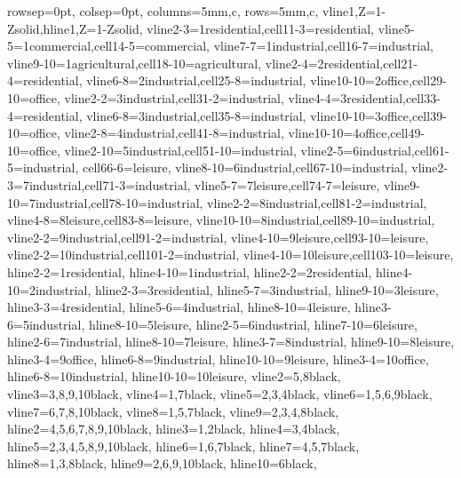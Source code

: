 \documentclass[margin=3mm]{standalone}
\begin{document}
\begin{tblr}{
rowsep=0pt, colsep=0pt, columns={5mm,c}, rows={5mm,c},
vline{1,Z}={1-Z}{solid},hline{1,Z}={1-Z}{solid},
vline{2-3}={1}{residential},cell{1}{1-3}={}{residential}, vline{5-5}={1}{commercial},cell{1}{4-5}={}{commercial}, vline{7-7}={1}{industrial},cell{1}{6-7}={}{industrial}, vline{9-10}={1}{agricultural},cell{1}{8-10}={}{agricultural}, vline{2-4}={2}{residential},cell{2}{1-4}={}{residential}, vline{6-8}={2}{industrial},cell{2}{5-8}={}{industrial}, vline{10-10}={2}{office},cell{2}{9-10}={}{office}, vline{2-2}={3}{industrial},cell{3}{1-2}={}{industrial}, vline{4-4}={3}{residential},cell{3}{3-4}={}{residential}, vline{6-8}={3}{industrial},cell{3}{5-8}={}{industrial}, vline{10-10}={3}{office},cell{3}{9-10}={}{office}, vline{2-8}={4}{industrial},cell{4}{1-8}={}{industrial}, vline{10-10}={4}{office},cell{4}{9-10}={}{office}, vline{2-10}={5}{industrial},cell{5}{1-10}={}{industrial}, vline{2-5}={6}{industrial},cell{6}{1-5}={}{industrial}, cell{6}{6-6}={}{leisure}, vline{8-10}={6}{industrial},cell{6}{7-10}={}{industrial}, vline{2-3}={7}{industrial},cell{7}{1-3}={}{industrial}, vline{5-7}={7}{leisure},cell{7}{4-7}={}{leisure}, vline{9-10}={7}{industrial},cell{7}{8-10}={}{industrial}, vline{2-2}={8}{industrial},cell{8}{1-2}={}{industrial}, vline{4-8}={8}{leisure},cell{8}{3-8}={}{leisure}, vline{10-10}={8}{industrial},cell{8}{9-10}={}{industrial}, vline{2-2}={9}{industrial},cell{9}{1-2}={}{industrial}, vline{4-10}={9}{leisure},cell{9}{3-10}={}{leisure}, vline{2-2}={10}{industrial},cell{10}{1-2}={}{industrial}, vline{4-10}={10}{leisure},cell{10}{3-10}={}{leisure}, hline{2-2}={1}{residential}, hline{4-10}={1}{industrial}, hline{2-2}={2}{residential}, hline{4-10}={2}{industrial}, hline{2-3}={3}{residential}, hline{5-7}={3}{industrial}, hline{9-10}={3}{leisure}, hline{3-3}={4}{residential}, hline{5-6}={4}{industrial}, hline{8-10}={4}{leisure}, hline{3-6}={5}{industrial}, hline{8-10}={5}{leisure}, hline{2-5}={6}{industrial}, hline{7-10}={6}{leisure}, hline{2-6}={7}{industrial}, hline{8-10}={7}{leisure}, hline{3-7}={8}{industrial}, hline{9-10}={8}{leisure}, hline{3-4}={9}{office}, hline{6-8}={9}{industrial}, hline{10-10}={9}{leisure}, hline{3-4}={10}{office}, hline{6-8}={10}{industrial}, hline{10-10}={10}{leisure}, 
vline{2}={5,8}{black}, vline{3}={3,8,9,10}{black}, vline{4}={1,7}{black}, vline{5}={2,3,4}{black}, vline{6}={1,5,6,9}{black}, vline{7}={6,7,8,10}{black}, vline{8}={1,5,7}{black}, vline{9}={2,3,4,8}{black}, hline{2}={4,5,6,7,8,9,10}{black}, hline{3}={1,2}{black}, hline{4}={3,4}{black}, hline{5}={2,3,4,5,8,9,10}{black}, hline{6}={1,6,7}{black}, hline{7}={4,5,7}{black}, hline{8}={1,3,8}{black}, hline{9}={2,6,9,10}{black}, hline{10}={6}{black}, 
}
\end{tblr}
\end{document}
